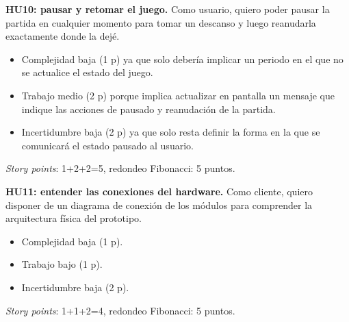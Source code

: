 \documentclass[
11pt, %
]{charter}
\begin{document}
	\textbf{HU10: pausar y retomar el juego.} Como usuario, quiero poder pausar la partida en cualquier momento para tomar un descanso y luego reanudarla exactamente donde la dejé.

	\begin{itemize}
		\item Complejidad baja (1 p) ya que solo debería implicar un periodo en el que no se actualice el estado del juego.
		\item Trabajo medio (2 p) porque implica actualizar en pantalla un mensaje que indique las acciones de pausado y reanudación de la partida. 
		\item Incertidumbre baja (2 p) ya que solo resta definir la forma en la que se comunicará el estado pausado al usuario. 
	\end{itemize}
	\textit{Story points}: 1+2+2=5, redondeo Fibonacci: 5 puntos.
		

	\textbf{HU11: entender las conexiones del hardware.} Como cliente, quiero disponer de un diagrama de conexión de los módulos para comprender la arquitectura física del prototipo.

	\begin{itemize}
		\item Complejidad baja (1 p).
		\item Trabajo bajo (1 p). 
		\item Incertidumbre baja (2 p). 
	\end{itemize}
	\textit{Story points}: 1+1+2=4, redondeo Fibonacci: 5 puntos.
		
\end{document}
